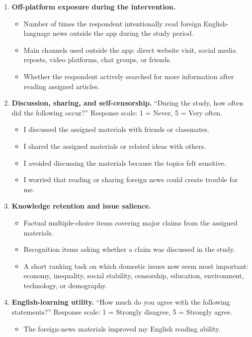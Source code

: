 \documentclass[12pt,american]{article}
\begin{document}
\begin{enumerate}[label=\arabic*., leftmargin=1.5em]
\begin{itemize}
\item Whether the respondent would recommend similar materials to a friend preparing for English exams.
\end{itemize}
\item \textbf{Off-platform exposure during the intervention.}
\begin{itemize}
\item Number of times the respondent intentionally read foreign English-language news outside the app during the study period.
\item Main channels used outside the app: direct website visit, social media reposts, video platforms, chat groups, or friends.
\item Whether the respondent actively searched for more information after reading assigned articles.
\end{itemize}
\item \textbf{Discussion, sharing, and self-censorship.} ``During the study, how often did the following occur?'' Response scale: 1 = Never, 5 = Very often.
\begin{itemize}
\item I discussed the assigned materials with friends or classmates.
\item I shared the assigned materials or related ideas with others.
\item I avoided discussing the materials because the topics felt sensitive.
\item I worried that reading or sharing foreign news could create trouble for me.
\end{itemize}
\item \textbf{Knowledge retention and issue salience.}
\begin{itemize}
\item Factual multiple-choice items covering major claims from the assigned materials.
\item Recognition items asking whether a claim was discussed in the study.
\item A short ranking task on which domestic issues now seem most important: economy, inequality, social stability, censorship, education, environment, technology, or demography.
\end{itemize}
\item \textbf{English-learning utility.} ``How much do you agree with the following statements?'' Response scale: 1 = Strongly disagree, 5 = Strongly agree.
\begin{itemize}
\item The foreign-news materials improved my English reading ability.

\end{itemize}
\end{enumerate}
\end{document}
